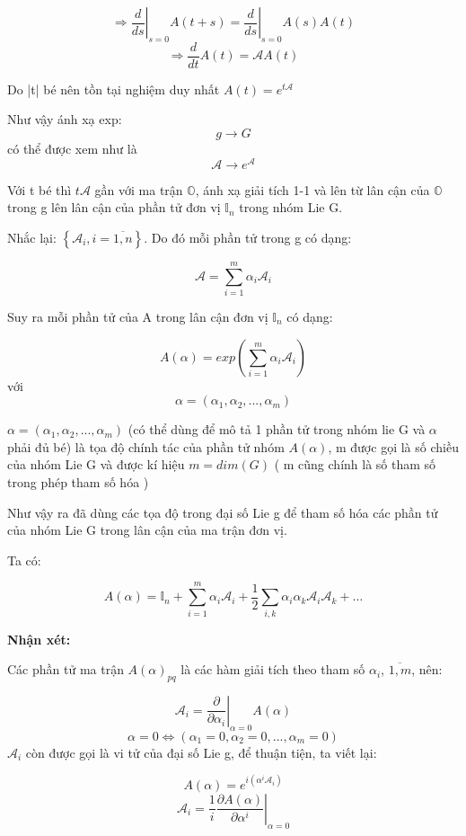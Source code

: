 \documentclass{report}
\begin{document}
\[ \Rightarrow \left. {\frac{d}{ds}} \right|_{s=0} A(t+s) = \left. {\frac{d}{ds}} \right|_{s=0} A(s)A(t) \]
\[ \Rightarrow \frac{d}{dt} A(t) = \mathcal{A}A(t) \]

Do |t| bé nên tồn tại nghiệm duy nhất \( A(t) = e^{t \mathcal{A} } \)

Như vậy ánh xạ exp: \[ g \rightarrow G \] có thể được xem như là \[ \mathcal{A} \rightarrow e^{\mathcal{A}} \]
		
Với t bé thì \(t\mathcal{A} \) gần với ma trận \( \mathbb{O} \), ánh xạ giải tích 1-1 và lên từ lân cận của \( \mathbb{O} \) trong g lên lân cận của phần tử đơn vị \( \mathbb{I}_{n} \) trong nhóm Lie G.

Nhắc lại: \( \left\lbrace \mathcal{A}_{i}, i = \overline{1,n} \right\rbrace \). Do đó mỗi phần tử trong g có dạng:

\[ \mathcal{A} = \sum_{i=1}^{m} \alpha_{i} \mathcal{A}_{i} \]

Suy ra mỗi phần tử của A trong lân cận đơn vị \( \mathbb{I}_{n} \) có dạng:


\[ A(\alpha) = exp \left( {\sum_{i=1}^{m} \alpha_{i} \mathcal{A}_{i}} \right) \] với \[ \alpha = (  \alpha_{1}, \alpha_{2}, ..., \alpha_{m} ) \]
	
\(	\alpha = (  \alpha_{1}, \alpha_{2}, ..., \alpha_{m} ) \) (có thể dùng để mô tả 1 phần tử trong nhóm lie G và \( \alpha \) phải đủ bé) là tọa độ chính tác của phần tử nhóm \( A(\alpha) \), m được gọi là số chiều của nhóm Lie G và được kí hiệu \( m = dim(G) \) ( m cũng chính là số tham số trong phép tham số hóa )

Như vậy ra đã dùng các tọa độ trong đại số Lie g để tham số hóa các phần tử của nhóm Lie G trong lân cận của ma trận đơn vị. 

Ta có:

\[ A(\alpha) = \mathbb{I}_{n} + \sum_{i=1}^{m} \alpha_{i} \mathcal{A}_{i} + \frac{1}{2} \sum_{i,k} \alpha_{i} \alpha_{k} \mathcal{A}_{i} \mathcal{A}_{k} + \dots \]

\textbf{Nhận xét:}

Các phần tử ma trận \( A(\alpha)_{pq} \) là các hàm giải tích theo tham số \( \alpha_{i} \), \( \overline{1,m} \), nên:

\[ \mathcal{A}_{i} = \left. \frac{\partial}{\partial \alpha_{i}} \right|_{\alpha = 0} A(\alpha) \]
\[ \alpha = 0 \Leftrightarrow (  \alpha_{1} = 0, \alpha_{2} = 0, ..., \alpha_{m} = 0) \]
\( \mathcal{A}_{i} \) còn được gọi là vi tử của đại số Lie g, để thuận tiện, ta viết lại:	

\[ A(\alpha) = e^{ i \left( { \alpha^{i} \mathcal{A}_{i}} \right) } \]
\[ \mathcal{A}_{i} = \frac{1}{i} \left. \frac{\partial A(\alpha)}{\partial \alpha^{i}} \right|_{\alpha = 0} \]
\end{document}
